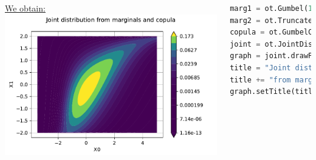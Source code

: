 \documentclass{beamer}
\begin{document}
\begin{frame}[containsverbatim]
\begin{columns}
\underline{We obtain:}
    \includegraphics[width=\textwidth]{figures/ComposedGumbel.pdf}
    


\tiny
\begin{lstlisting}[language=Python, numbers = none]
marg1 = ot.Gumbel(1.0, 0.0)
marg2 = ot.TruncatedNormal(0.0, 1.0, -2.0, 2.0)
copula = ot.GumbelCopula()
joint = ot.JointDistribution([marg1, marg2], copula)
graph = joint.drawPDF()
title = "Joint distribution "
title += "from marginals and copula"
graph.setTitle(title)
\end{lstlisting}




\end{columns}


\end{frame}

\end{document}
